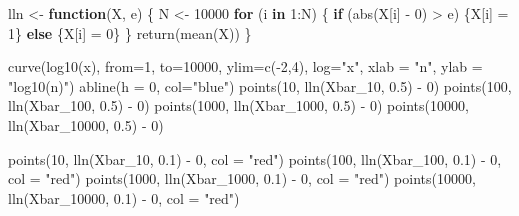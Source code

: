 \documentclass[
]{article}
\newenvironment{Shaded}{\begin{snugshade}}{\end{snugshade}}
\newcommand{\AttributeTok}[1]{\textcolor[rgb]{0.77,0.63,0.00}{#1}}
\newcommand{\ControlFlowTok}[1]{\textcolor[rgb]{0.13,0.29,0.53}{\textbf{#1}}}
\newcommand{\DecValTok}[1]{\textcolor[rgb]{0.00,0.00,0.81}{#1}}
\newcommand{\FloatTok}[1]{\textcolor[rgb]{0.00,0.00,0.81}{#1}}
\newcommand{\FunctionTok}[1]{\textcolor[rgb]{0.00,0.00,0.00}{#1}}
\newcommand{\NormalTok}[1]{#1}
\newcommand{\OtherTok}[1]{\textcolor[rgb]{0.56,0.35,0.01}{#1}}
\newcommand{\SpecialCharTok}[1]{\textcolor[rgb]{0.00,0.00,0.00}{#1}}
\newcommand{\StringTok}[1]{\textcolor[rgb]{0.31,0.60,0.02}{#1}}
\begin{document}
\begin{Shaded}
\begin{Highlighting}[]
\NormalTok{lln }\OtherTok{\textless{}{-}} \ControlFlowTok{function}\NormalTok{(X, e) \{}
\NormalTok{  N }\OtherTok{\textless{}{-}} \DecValTok{10000}
  \ControlFlowTok{for}\NormalTok{ (i }\ControlFlowTok{in} \DecValTok{1}\SpecialCharTok{:}\NormalTok{N) \{}
    \ControlFlowTok{if}\NormalTok{ (}\FunctionTok{abs}\NormalTok{(X[i] }\SpecialCharTok{{-}} \DecValTok{0}\NormalTok{) }\SpecialCharTok{\textgreater{}}\NormalTok{ e) \{X[i] }\OtherTok{=} \DecValTok{1}\NormalTok{\}}
    \ControlFlowTok{else}\NormalTok{ \{X[i] }\OtherTok{=} \DecValTok{0}\NormalTok{\}}
\NormalTok{  \}}
  \FunctionTok{return}\NormalTok{(}\FunctionTok{mean}\NormalTok{(X))}
\NormalTok{\}}

\FunctionTok{curve}\NormalTok{(}\FunctionTok{log10}\NormalTok{(x), }\AttributeTok{from=}\DecValTok{1}\NormalTok{, }\AttributeTok{to=}\DecValTok{10000}\NormalTok{, }\AttributeTok{ylim=}\FunctionTok{c}\NormalTok{(}\SpecialCharTok{{-}}\DecValTok{2}\NormalTok{,}\DecValTok{4}\NormalTok{), }\AttributeTok{log=}\StringTok{"x"}\NormalTok{, }\AttributeTok{xlab =} \StringTok{"n"}\NormalTok{, }\AttributeTok{ylab =} \StringTok{"log10(n)"}\NormalTok{)}
\FunctionTok{abline}\NormalTok{(}\AttributeTok{h =} \DecValTok{0}\NormalTok{, }\AttributeTok{col=}\StringTok{"blue"}\NormalTok{)}
\FunctionTok{points}\NormalTok{(}\DecValTok{10}\NormalTok{, }\FunctionTok{lln}\NormalTok{(Xbar\_10, }\FloatTok{0.5}\NormalTok{) }\SpecialCharTok{{-}} \DecValTok{0}\NormalTok{)}
\FunctionTok{points}\NormalTok{(}\DecValTok{100}\NormalTok{, }\FunctionTok{lln}\NormalTok{(Xbar\_100, }\FloatTok{0.5}\NormalTok{) }\SpecialCharTok{{-}} \DecValTok{0}\NormalTok{)}
\FunctionTok{points}\NormalTok{(}\DecValTok{1000}\NormalTok{, }\FunctionTok{lln}\NormalTok{(Xbar\_1000, }\FloatTok{0.5}\NormalTok{) }\SpecialCharTok{{-}} \DecValTok{0}\NormalTok{)}
\FunctionTok{points}\NormalTok{(}\DecValTok{10000}\NormalTok{, }\FunctionTok{lln}\NormalTok{(Xbar\_10000, }\FloatTok{0.5}\NormalTok{) }\SpecialCharTok{{-}} \DecValTok{0}\NormalTok{)}

\FunctionTok{points}\NormalTok{(}\DecValTok{10}\NormalTok{, }\FunctionTok{lln}\NormalTok{(Xbar\_10, }\FloatTok{0.1}\NormalTok{) }\SpecialCharTok{{-}} \DecValTok{0}\NormalTok{, }\AttributeTok{col =} \StringTok{"red"}\NormalTok{)}
\FunctionTok{points}\NormalTok{(}\DecValTok{100}\NormalTok{, }\FunctionTok{lln}\NormalTok{(Xbar\_100, }\FloatTok{0.1}\NormalTok{) }\SpecialCharTok{{-}} \DecValTok{0}\NormalTok{, }\AttributeTok{col =} \StringTok{"red"}\NormalTok{)}
\FunctionTok{points}\NormalTok{(}\DecValTok{1000}\NormalTok{, }\FunctionTok{lln}\NormalTok{(Xbar\_1000, }\FloatTok{0.1}\NormalTok{) }\SpecialCharTok{{-}} \DecValTok{0}\NormalTok{, }\AttributeTok{col =} \StringTok{"red"}\NormalTok{)}
\FunctionTok{points}\NormalTok{(}\DecValTok{10000}\NormalTok{, }\FunctionTok{lln}\NormalTok{(Xbar\_10000, }\FloatTok{0.1}\NormalTok{) }\SpecialCharTok{{-}} \DecValTok{0}\NormalTok{, }\AttributeTok{col =} \StringTok{"red"}\NormalTok{)}


\end{Highlighting}
\end{Shaded}
\end{document}
